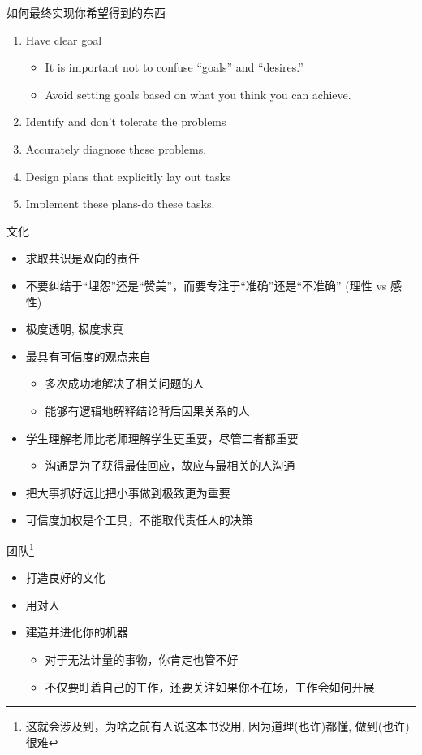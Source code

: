 \documentclass[presentation, bigger]{beamer}
\begin{document}
\begin{frame}[label={sec:orga0af169}]{如何最终实现你希望得到的东西}
\begin{enumerate}
\item Have clear goal
\begin{itemize}
\item It is important not to confuse “goals” and “desires.”
\item Avoid setting goals based on what you think you can achieve.
\end{itemize}
\item Identify and don’t tolerate the problems
\item Accurately diagnose these problems.
\item Design plans that explicitly lay out tasks
\item Implement these plans-do these tasks.
\end{enumerate}
\end{frame}
\begin{frame}[label={sec:org7bb73df}]{文化}
\begin{itemize}
\item 求取共识是双向的责任
\item 不要纠结于“埋怨”还是“赞美”，而要专注于“准确”还是“不准确” (理性 vs 感性)
\item 极度透明, 极度求真
\item 最具有可信度的观点来自
\begin{itemize}
\item 多次成功地解决了相关问题的人
\item 能够有逻辑地解释结论背后因果关系的人
\end{itemize}
\item 学生理解老师比老师理解学生更重要，尽管二者都重要
\begin{itemize}
\item 沟通是为了获得最佳回应，故应与最相关的人沟通
\end{itemize}
\item 把大事抓好远比把小事做到极致更为重要
\item 可信度加权是个工具，不能取代责任人的决策
\end{itemize}
\end{frame}

\begin{frame}[label={sec:org4223544}]{团队\footnote{这就会涉及到，为啥之前有人说这本书没用, 因为道理(也许)都懂, 做到(也许)很难}}
\begin{itemize}
\item 打造良好的文化
\item 用对人
\item 建造并进化你的机器
\begin{itemize}
\item 对于无法计量的事物，你肯定也管不好
\item 不仅要盯着自己的工作，还要关注如果你不在场，工作会如何开展
\end{itemize}
\end{itemize}
\end{frame}
\end{document}
